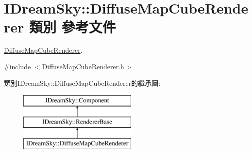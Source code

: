 \hypertarget{class_i_dream_sky_1_1_diffuse_map_cube_renderer}{}\section{I\+Dream\+Sky\+:\+:Diffuse\+Map\+Cube\+Renderer 類別 參考文件}
\label{class_i_dream_sky_1_1_diffuse_map_cube_renderer}


\hyperlink{class_i_dream_sky_1_1_diffuse_map_cube_renderer}{Diffuse\+Map\+Cube\+Renderer}.  




{\ttfamily \#include $<$Diffuse\+Map\+Cube\+Renderer.\+h$>$}

類別\+I\+Dream\+Sky\+:\+:Diffuse\+Map\+Cube\+Renderer的繼承圖\+:\begin{figure}[H]
\begin{center}
\leavevmode
\includegraphics[height=3.000000cm]{class_i_dream_sky_1_1_diffuse_map_cube_renderer}
\end{center}
\end{figure}
